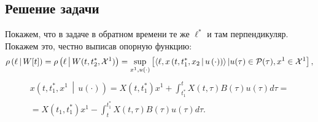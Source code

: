 \subsection{Решение задачи}
Покажем, что в задаче в обратном времени те же $\ell^*$ и там перпендикуляр.
Покажем это, честно выписав опорную функцию:
\begin{gather*}
  \rho\left(\ell\,\middle|\,W[t]\right) = \rho\left(\ell\,\middle|\,W(t, t_2^*, \mathcal{X}^1)\right) =
  \sup_{x^1, u(\cdot)}
    \left[\left<\ell,x\left(t,t_1^*,x_2 \,\middle|\, u\left(\cdot\right)\right)\right>|
  u(\tau) \in \mathcal{P}(\tau), x^1\in\mathcal {X}^1\right],
\end{gather*}
\begin{gather*}
  x\left(t, t_1^*, x^1 \,\middle|\, u(\cdot)\right) =
    X(t, t_1^*)x^1 + \int_{t_1^*}^t X(t, \tau) B(\tau) u(\tau) d\tau =\\
    = X(t_1, t_1^*)x^1 - \int_t^{t_1^*}X(t, \tau) B(\tau) u(\tau) d\tau.
\end{gather*}

